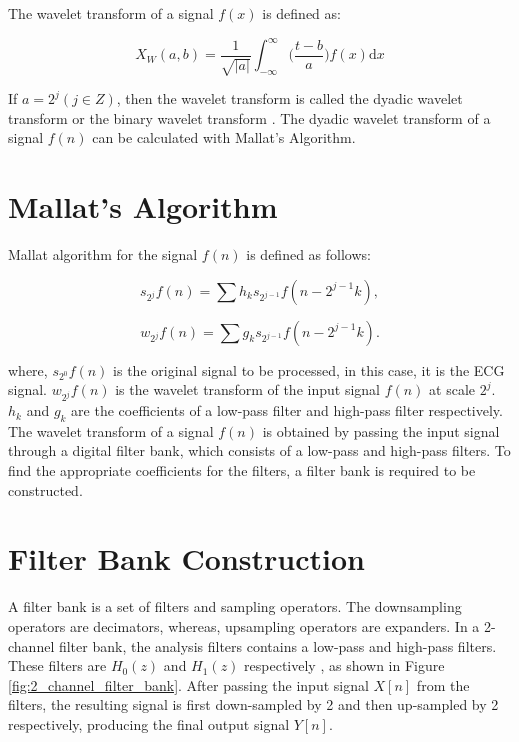 The wavelet transform of a signal $f(x)$ is defined as:

\begin{equation} \label{eqn_wavelet_transform}
{X_{W}(a, b) = \frac{1}{\sqrt{|a|}} \int_{-\infty}^\infty \bigg(\frac{t-b}{a}\bigg)f(x) \mathrm{d}x}
\end{equation}

If $a=2^j (j \in Z)$, then the wavelet transform is called the dyadic wavelet transform or the binary wavelet transform \cite{119727}. The dyadic wavelet transform of a signal $f(n)$ can be calculated with Mallat's Algorithm.



\section{Mallat's Algorithm}
Mallat algorithm \cite{119727} for the signal $f(n)$ is defined as follows:

\begin{equation} 
{ s_{2^j}f(n) = \sum h_ks_{2^{j-1}}f(n - 2^{j-1}k),   }
\end{equation}

\begin{equation} 
{ w_{2^j}f(n) = \sum g_ks_{2^{j-1}}f(n - 2^{j-1}k).   }
\end{equation}

where, $s_{2^0}f(n)$ is the original signal to be processed, in this case, it is the ECG signal. $w_{2^j}f(n)$ is the wavelet transform of the input signal $f(n)$ at scale $2^j$. $h_k$ and $g_k$ are the coefficients of a low-pass filter and high-pass filter respectively. The wavelet transform of a signal $f(n)$ is obtained by passing the input signal through a digital filter bank, which consists of a low-pass and high-pass filters. To find the appropriate coefficients for the filters, a filter bank is required to be constructed. 


\section{Filter Bank Construction}
A filter bank is a set of filters and sampling operators. The downsampling operators are decimators, whereas, upsampling operators are expanders. In a 2-channel filter bank, the analysis filters contains a low-pass and high-pass filters. These filters are ${H_{0}(z)}$ and ${H_{1}(z)}$ respectively \cite{wang2001using}, as shown in Figure \ref{fig:2_channel_filter_bank}. After passing the input signal $X[n]$ from the filters, the resulting signal is first down-sampled by 2 and then up-sampled by 2 respectively, producing the final output signal $Y[n]$. 

